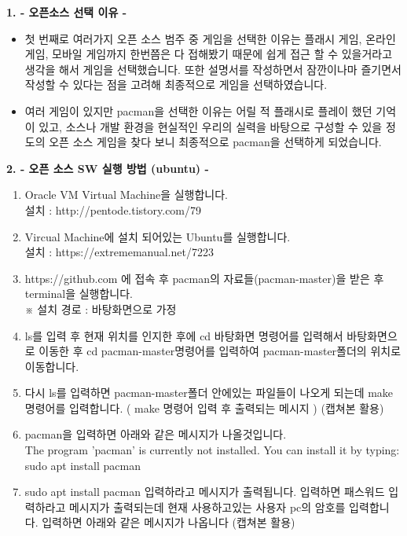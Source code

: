 \documentclass{article}
\begin{document}
\flushleft
\textbf{1. - 오픈소스 선택 이유 -}
\begin{itemize}

\item 첫 번째로 여러가지 오픈 소스 범주 중 게임을 선택한 이유는 플래시 게임, 온라인 게임, 모바일 게임까지 한번쯤은 다 접해봤기 때문에 쉽게 접근 할 수 있을거라고 생각을 해서 게임을 선택했습니다. 또한 설명서를 작성하면서 잠깐이나마 즐기면서 작성할 수 있다는 점을 고려해 최종적으로 게임을 선택하였습니다.\\

\item 여러 게임이 있지만 pacman을 선택한 이유는 어릴 적 플래시로 플레이 했던 기억이 있고, 소스나 개발 환경을 현실적인 우리의 실력을 바탕으로 구성할 수 있을 정도의 오픈 소스 게임을 찾다 보니 최종적으로 pacman을 선택하게 되었습니다.

\end{itemize}

\newpage
\textbf{2. - 오픈 소스 SW 실행 방법 (ubuntu) -}
\begin{enumerate}
\item Oracle VM Virtual Machine을 실행합니다. \\
설치 : http://pentode.tistory.com/79\\

\item Vircual Machine에 설치 되어있는 Ubuntu를 실행합니다. \\
설치 : https://extrememanual.net/7223\\

\item https://github.com 에 접속 후 pacman의 자료들(pacman-master)을 받은 후 terminal을 실행합니다. \\※ 설치 경로 : 바탕화면으로 가정\\
\item ls를 입력 후 현재 위치를 인지한 후에 cd 바탕화면 명령어를 입력해서 바탕화면으로 이동한 후 cd pacman-master명령어를 입력하여 pacman-master폴더의 위치로 이동합니다.\\
\item 다시 ls를 입력하면 pacman-master폴더 안에있는 파일들이 나오게 되는데 make 명령어를 입력합니다. ( make 명령어 입력 후 출력되는 메시지 ) (캡쳐본 활용)\\
\item pacman을 입력하면 아래와 같은 메시지가 나올것입니다. \\
The program 'pacman' is currently not installed. You can install it by typing: sudo apt install pacman\\
\item sudo apt install pacman 입력하라고 메시지가 출력됩니다. 입력하면 패스워드 입력하라고 메시지가 출력되는데 현재 사용하고있는 사용자 pc의 암호를 입력합니다. 입력하면 아래와 같은 메시지가 나옵니다 (캡쳐본 활용)
\end{enumerate}
\end{document}
